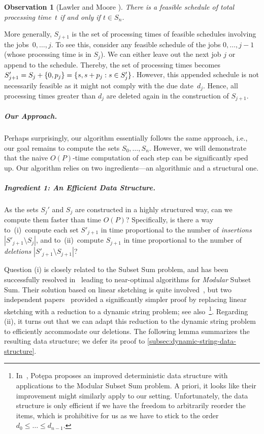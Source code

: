 \documentclass[10pt,a4paper]{article}
\newtheorem{observation}{Observation}[section]
\DeclarePairedDelimiter\set{\lbrace}{\rbrace}
\newcommand\Order{O}
\begin{document}
\begin{observation}[Lawler and Moore \cite{LawlerM69}]
    \label{obs:s-sets}
    There is a feasible schedule of total processing time~$t$ if and only if $t \in S_n$.
\end{observation}

More generally, $S_{j+1}$ is the set of processing times of feasible schedules involving the jobs~$0, \dots, j$. To see this, consider any feasible schedule of the jobs $0, \dots, j-1$ (whose processing time is in $S_j$). We can either leave out the next job $j$ or append to the schedule. Thereby, the set of processing times becomes $S'_{j+1} = S_j + \set{0, p_j} = \set{s, s + p_j : s \in S'_{j}}$. However, this appended schedule is not necessarily feasible as it might not comply with the due date~$d_j$. Hence, all processing times greater than $d_j$ are deleted again in the construction of $S_{j+1}$.

\subparagraph{Our Approach.}
Perhaps surprisingly, our algorithm essentially follows the same approach, i.e., our goal remains to compute the sets $S_0, \dots, S_n$. However, we will demonstrate that the naive $\Order(P)$-time computation of each step can be significantly sped up. Our algorithm relies on two ingredients---an algorithmic and a structural one.

\subparagraph{Ingredient 1: An Efficient Data Structure.}
As the sets $S_j'$ and $S_j$ are constructed in a highly structured way, can we compute them faster than time $\Order(P)$? Specifically, is there a way to~(i)~compute each set $S'_{j+1}$ in time proportional to the number of \emph{insertions} $|S'_{j+1} \setminus S_j|$, and to~(ii)~compute $S_{j+1}$ in time proportional to the number of \emph{deletions} $|S'_{j+1} \setminus S_{j+1}|$?

Question (i) is closely related to the Subset Sum problem, and has been successfully resolved in~\cite{AxiotisBJTW19} leading to near-optimal algorithms for \emph{Modular} Subset Sum. Their solution based on linear sketching is quite involved~\cite{AxiotisBJTW19}, but two independent papers~\cite{AxiotisBBJNTW21,CardinalI21} provided a significantly simpler proof by replacing linear sketching with a reduction to a dynamic string problem; see also~\cite{Potepa21}\footnote{In~\cite{Potepa21}, Pot\k{e}pa proposes an improved deterministic data structure with applications to the Modular Subset Sum problem. A priori, it looks like their improvement might similarly apply to our setting. Unfortunately, the data structure is only efficient if we have the freedom to arbitrarily reorder the items, which is prohibitive for us as we have to stick to the order $d_0 \leq \dots \leq d_{n-1}$.}. Regarding (ii), it turns out that we can adapt this reduction to the dynamic string problem to efficiently accommodate our deletions. The following lemma summarizes the resulting data structure; we defer its proof to \cref{subsec:dynamic-string-data-structure}.
\end{document}
